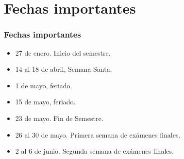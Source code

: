 \documentclass[12pt]{beamer}
\begin{document}
\section{Fechas importantes}
\begin{frame}
\frametitle{Fechas importantes}
\begin{itemize}
\item 27 de enero. Inicio del semestre.
\item 14 al 18 de abril, Semana Santa.
\item 1 de mayo, feriado.
\item 15 de mayo, feriado.
\item 23 de mayo. Fin de Semestre.
\item 26 al 30 de mayo. Primera semana de exámenes finales.
\item 2 al 6 de junio. Segunda semana de exámenes finales.
\end{itemize}
\end{frame}
\end{document}
